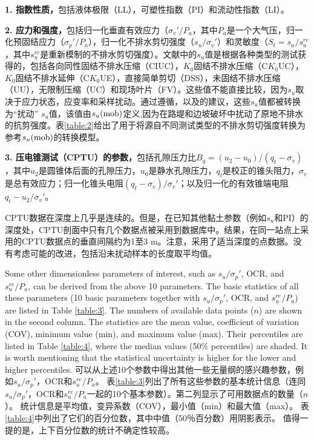 \begin{Parallel}{0.60\textwidth}{}
{        \textbf{1. 指数性质，}包括液体极限（LL），可塑性指数（PI）和流动性指数（LI）。

        \textbf{2. 应力和强度，}包括归一化垂直有效应力（$\sigma_v'/P_a$，其中$P_a$是一个大气压，归一化预固结应力（$\sigma_p'/P_a$），归一化不排水剪切强度（$s_u/\sigma_v'$）和灵敏度（$S_t=s_u/s_u^{re}$，其中$s_u^{re}$是重新模制的不排水剪切强度）。文献中的$s_u$值是根据各种类型的测试获得的，包括各向同性固结不排水压缩（CIUC），$K_0$固结不排水压缩（C$K_0$UC），$K_0$固结不排水延伸（C$K_0$UE），直接简单剪切（DSS），未固结不排水压缩（UU），无限制压缩（UC）和现场叶片（FV）。这些值不能直接比较，因为$s_u$取决于应力状态，应变率和采样扰动。通过遵循\citet{Bjerrum19721}，\citet{Kulhawy1990}以及\citet{Mesri20071}的建议，这些$s_u$值都被转换为“扰动” $s_u$值，该值由$s_u(\rm{mob})$定义,因为在路堤和边坡破坏中扰动了原地不排水的抗剪强度\citep{Mesri20071}。表\ref{table:2}给出了用于将源自不同测试类型的不排水剪切强度转换为参考$s_u(\rm{mob})$的转换模型。

        \textbf{3. 压电锥测试（CPTU）的参数，}包括孔隙压力比$B_q=(u_2-u_0)/(q_t-\sigma_v)$，其中$u_2$是圆锥体后面的孔隙压力，$u_0$是静水孔隙压力，$q_t$是校正的锥头阻力，$\sigma_v$是总有效应力；归一化锥头电阻$(q_t-\sigma_v)/\sigma_v'$；以及归一化的有效锥端电阻$q_t-u_2/\sigma_v'$。\par
        CPTU数据在深度上几乎是连续的。但是，在已知其他黏土参数（例如$s_u$和PI）的深度处，CPTU剖面中只有几个数据点被采用到数据库中。结果，在同一站点上采用的CPTU数据点的垂直间隔约为1至3 m。注意，采用了适当深度的点数据。没有考虑可能的改进，包括沿未扰动样本的长度取平均值。
    }
    \ParallelPar
    
    \ParallelLText
    {
        Some other dimensionless parameters of interest, such as $s_u/\sigma_p'$, OCR, and $s_u^{re}/P_a$, can be derived from the above 10 parameters. The basic statistics of all these parameters (10 basic parameters together with $s_u/\sigma_p'$, OCR, and $s_u^{re}/P_a$) are listed in Table \ref{table:3}. The numbers of available data points ($n$) are shown in the second column. The statistics are the mean value, coefficient of variation (COV), minimum value (min), and maximum value (max). Their percentiles are listed in Table \ref{table:4}, where the median values (50$\%$ percentiles) are shaded. It is worth mentioning that the statistical uncertainty is higher for the lower and higher percentiles.
    }
    \ParallelRText
    {
        可以从上述10个参数中得出其他一些无量纲的感兴趣参数，例如$s_u/\sigma_p'$，OCR和$s_u^{re}/P_a$。 表\ref{table:3}列出了所有这些参数的基本统计信息（连同$s_u/\sigma_p'$，OCR和$s_u^{re}/P_a$一起的10个基本参数）。第二列显示了可用数据点的数量（$n$）。 统计信息是平均值，变异系数（COV），最小值（min）和最大值（max）。 表\ref{table:4}中列出了它们的百分位数，其中中值（50％百分数）用阴影表示。 值得一提的是，上下百分位数的统计不确定性较高。
    }
    \ParallelPar
    
\end{Parallel}
